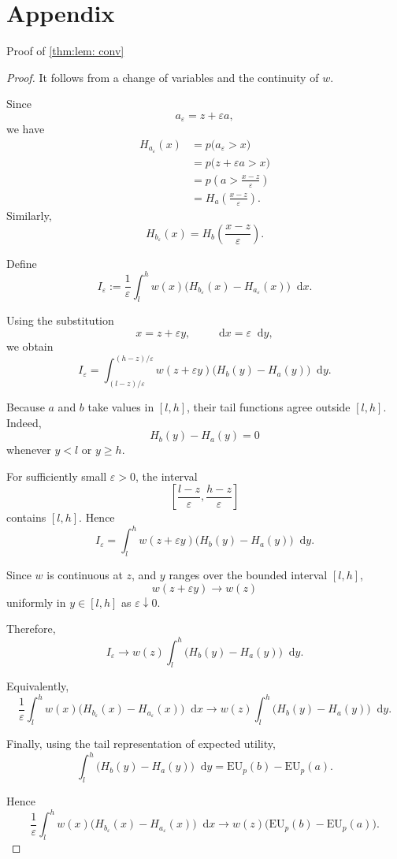 \documentclass[a4paper,final]{article}
\newcommand\EU{\mathrm{EU}}
\newcommand*\diff{\mathop{}\!\mathrm{d}}
\renewcommand{\geq}{\geqslant}
\newenvironment{CCM rewritten}
{\begingroup\color{blue}} %
{\endgroup}              %
\begin{document}
\part{Appendix}
\label{sec:pf of lem}Proof of \cref{thm:lem: conv}
\begin{proof}
It follows from a change of variables and the continuity of $w$.

Since
\[
a_\varepsilon=z+\varepsilon a,
\]
we have
\begin{align}
H_{a_\varepsilon}(x)
&=
p\bigl(a_\varepsilon>x\bigr)\\
&=
p\bigl(z+\varepsilon a>x\bigr)\\
&=
p\left(
a>\frac{x-z}{\varepsilon}
\right)\\
&=
H_a\left(
\frac{x-z}{\varepsilon}
\right).
\end{align}
Similarly,
\[
H_{b_\varepsilon}(x)
=
H_b\left(
\frac{x-z}{\varepsilon}
\right).
\]

Define
\[
I_\varepsilon
:=
\frac{1}{\varepsilon}
\int_l^h
w(x)
\bigl(
H_{b_\varepsilon}(x)-H_{a_\varepsilon}(x)
\bigr)
\diff x.
\]

Using the substitution
\[
x=z+\varepsilon y,
\qquad
\diff x=\varepsilon\diff y,
\]
we obtain
\[
I_\varepsilon
=
\int_{(l-z)/\varepsilon}^{(h-z)/\varepsilon}
w(z+\varepsilon y)
\bigl(
H_b(y)-H_a(y)
\bigr)
\diff y.
\]

Because $a$ and $b$ take values in $[l,h]$, their tail functions agree
outside $[l,h]$. Indeed,
\[
H_b(y)-H_a(y)=0
\]
whenever $y<l$ or $y\geq h$.

For sufficiently small $\varepsilon>0$, the interval
\[
\left[
\frac{l-z}{\varepsilon},
\frac{h-z}{\varepsilon}
\right]
\]
contains $[l,h]$. Hence
\[
I_\varepsilon
=
\int_l^h
w(z+\varepsilon y)
\bigl(
H_b(y)-H_a(y)
\bigr)
\diff y.
\]

Since $w$ is continuous at $z$, and $y$ ranges over the bounded interval
$[l,h]$,
\[
w(z+\varepsilon y)\longrightarrow w(z)
\]
uniformly in $y\in[l,h]$ as $\varepsilon\downarrow0$.

Therefore,
\[
I_\varepsilon
\longrightarrow
w(z)
\int_l^h
\bigl(
H_b(y)-H_a(y)
\bigr)
\diff y.
\]

Equivalently,
\[
\frac{1}{\varepsilon}
\int_l^h
w(x)
\bigl(
H_{b_\varepsilon}(x)-H_{a_\varepsilon}(x)
\bigr)
\diff x
\longrightarrow
w(z)
\int_l^h
\bigl(
H_b(y)-H_a(y)
\bigr)
\diff y.
\]

Finally, using the tail representation of expected utility,
\[
\int_l^h
\bigl(
H_b(y)-H_a(y)
\bigr)
\diff y
=
\EU_p(b)-\EU_p(a).
\]

Hence
\[
\frac{1}{\varepsilon}
\int_l^h
w(x)
\bigl(
H_{b_\varepsilon}(x)-H_{a_\varepsilon}(x)
\bigr)
\diff x
\longrightarrow
w(z)
\bigl(
\EU_p(b)-\EU_p(a)
\bigr).
\]
\end{proof}
\end{document}

